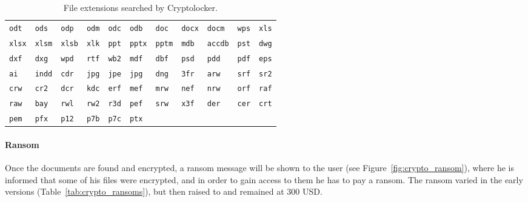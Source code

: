 \begin{table}[!htp]
    \centering
    \begin{tabular}{*{11}{l}}
        \texttt{odt}  & \texttt{ods}  & \texttt{odp}  & \texttt{odm} & \texttt{odc} & \texttt{odb} & \texttt{doc} & \texttt{docx} & \texttt{docm} & \texttt{wps} & \texttt{xls} \\
        \texttt{xlsx} & \texttt{xlsm} & \texttt{xlsb} & \texttt{xlk} & \texttt{ppt} & \texttt{pptx} & \texttt{pptm} & \texttt{mdb} & \texttt{accdb} & \texttt{pst} & \texttt{dwg} \\
        \texttt{dxf} & \texttt{dxg} & \texttt{wpd} & \texttt{rtf} & \texttt{wb2} & \texttt{mdf} & \texttt{dbf} & \texttt{psd} & \texttt{pdd} & \texttt{pdf} & \texttt{eps} \\
        \texttt{ai} & \texttt{indd} & \texttt{cdr} & \texttt{jpg} & \texttt{jpe} & \texttt{jpg} & \texttt{dng} & \texttt{3fr} & \texttt{arw} & \texttt{srf} & \texttt{sr2} \\
        \texttt{crw} & \texttt{cr2} & \texttt{dcr} & \texttt{kdc} & \texttt{erf} & \texttt{mef} & \texttt{mrw} & \texttt{nef} & \texttt{nrw} & \texttt{orf} & \texttt{raf} \\
        \texttt{raw} & \texttt{bay} & \texttt{rwl} & \texttt{rw2} & \texttt{r3d} & \texttt{pef} & \texttt{srw} & \texttt{x3f} & \texttt{der} & \texttt{cer} & \texttt{crt} \\
        \texttt{pem} & \texttt{pfx} & \texttt{p12} & \texttt{p7b} & \texttt{p7c} & \texttt{ptx} \\
    \end{tabular}
    \caption{File extensions searched by Cryptolocker.}
    \label{tab:crypto_ext}
\end{table}

\paragraph{Ransom} Once the documents are found and encrypted, a ransom message
will be shown to the user (see Figure~\ref{fig:crypto_ransom}), where he is informed
that some of his files were encrypted, and in order to gain access to them he has
to pay a ransom. The ransom varied in the early versions
(Table~\ref{tab:crypto_ransoms}), but then raised to and remained at 300 USD.

